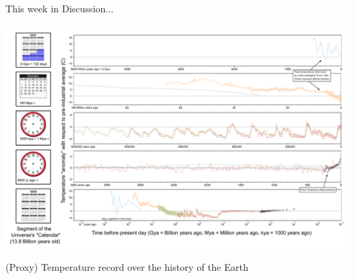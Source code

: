 \documentclass[12pt]{beamer}
\begin{document}
\begin{frame}{This week in Discussion...}

\begin{center}
\includegraphics[width=\textwidth]{images/timescales-of-earth-and-temperature}
\end{center}

(Proxy) Temperature record over the history of the Earth

\end{frame}
\end{document}
